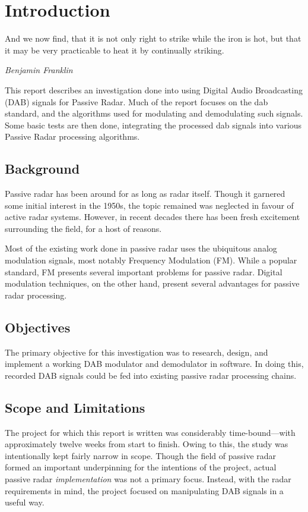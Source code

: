 \documentclass[class=report,11pt,crop=false]{standalone}
\begin{document}
\chapter{Introduction}
\epigraph{And we now find, that it is not only right to strike while the iron is hot, but that it may be very practicable to heat it by continually striking.}%
    {\emph{Benjamin Franklin}}

This report describes an investigation done into using Digital Audio Broadcasting (DAB) signals for Passive Radar. Much of the report focuses on the \acrfull{dab} standard, and the algorithms used for modulating and demodulating such signals. Some basic tests are then done, integrating the processed \acrshort{dab} signals into various Passive Radar processing algorithms.

\section{Background}
Passive radar has been around for as long as radar itself. Though it garnered some initial interest in the 1950s, the topic remained was neglected in favour of active radar systems. However, in recent decades there has been fresh excitement surrounding the field, for a host of reasons.

Most of the existing work done in passive radar uses the ubiquitous analog modulation signals, most notably Frequency Modulation (FM). While a popular standard, FM presents several important problems for passive radar. Digital modulation techniques, on the other hand, present several advantages for passive radar processing.

\section{Objectives}
The primary objective for this investigation was to research, design, and implement a working DAB modulator and demodulator in software. In doing this, recorded DAB signals could be fed into existing passive radar processing chains. 

\section{Scope and Limitations}
The project for which this report is written was considerably time-bound---with approximately twelve weeks from start to finish. Owing to this, the study was intentionally kept fairly narrow in scope. Though the field of passive radar formed an important underpinning for the intentions of the project, actual passive radar \emph{implementation} was not a primary focus. Instead, with the radar requirements in mind, the project focused on manipulating DAB signals in a useful way.
\end{document}
